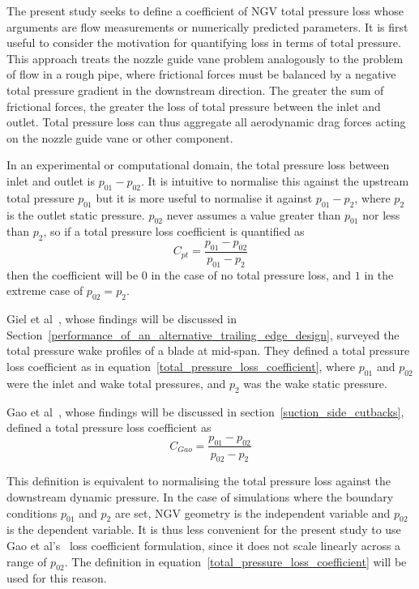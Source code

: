 \documentclass[a4paper, 11pt, oneside]{report}
\begin{document}
The present study seeks to define a coefficient of NGV total pressure loss whose arguments are flow measurements or numerically predicted parameters. It is first useful to consider the motivation for quantifying loss in terms of total pressure. This approach treats the nozzle guide vane problem analogously to the problem of flow in a rough pipe, where frictional forces must be balanced by a negative total pressure gradient in the downstream direction. The greater the sum of frictional forces, the greater the loss of total pressure between the inlet and outlet. Total pressure loss can thus aggregate all aerodynamic drag forces acting on the nozzle guide vane or other component.

In an experimental or computational domain, the total pressure loss between inlet and outlet is $p_{01} - p_{02}$. It is intuitive to normalise this against the upstream total pressure $p_{01}$ but it is more useful to normalise it against $p_{01} - p_2$, where $p_2$ is the outlet static pressure. $p_{02}$ never assumes a value greater than $p_{01}$ nor less than $p_2$, so if a total pressure loss coefficient is quantified as
\begin{equation}\label{total_pressure_loss_coefficient}
C_{pt} = \frac{
p_{01} - p_{02}
}{
p_{01} - p_2
}
\end{equation}
then the coefficient will be $0$ in the case of no total pressure loss, and $1$ in the extreme case of $p_{02} = p_2$.

Giel et al~\cite{giel_te_thickness}, whose findings will be discussed in Section~\ref{performance_of_an_alternative_trailing_edge_design}, surveyed the total pressure wake profiles of a blade at mid-span. They defined a total pressure loss coefficient as in equation~\ref{total_pressure_loss_coefficient}, where $p_{01}$ and $p_{02}$ were the inlet and wake total pressures, and $p_2$ was the wake static pressure. 

Gao et al~\cite{gao_te}, whose findings will be discussed in section~\ref{suction_side_cutbacks}, defined a total pressure loss coefficient as
\begin{equation}
C_{Gao} = \frac{
p_{01} - p_{02}
}{
p_{02} - p_2
}
\end{equation}

This definition is equivalent to normalising the total pressure loss against the downstream dynamic pressure. In the case of simulations where the boundary conditions $p_{01}$ and $p_2$ are set, NGV geometry is the independent variable and $p_{02}$ is the dependent variable. It is thus less convenient for the present study to use Gao et al's~\cite{gao_te} loss coefficient formulation, since it does not scale linearly across a range of $p_{02}$. The definition in equation~\ref{total_pressure_loss_coefficient} will be used for this reason.
\end{document}
